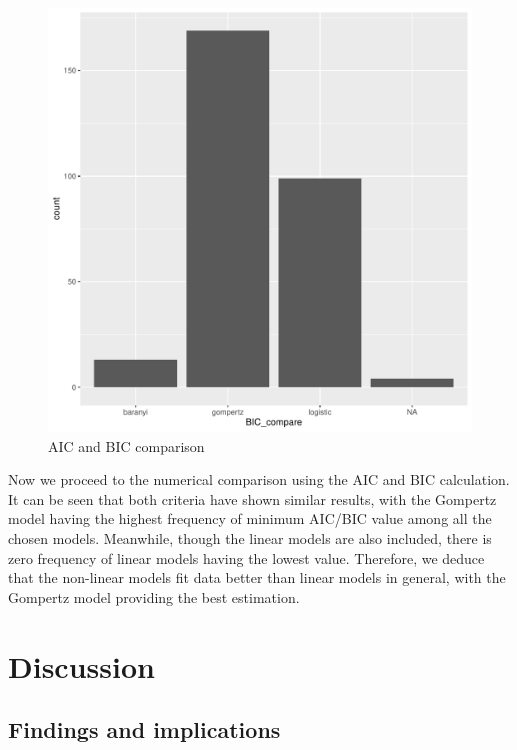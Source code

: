 \documentclass[11pt, oneside]{article}
\begin{document}
\begin{figure}[H]
\begin{center}
\begin{minipage}{.5\textwidth}
				\includegraphics[scale = 0.4]{BIC_plot.pdf}
			\end{minipage}
			\end{center}
		\caption{AIC and BIC comparison}
		\end{figure}
		
		\noindent Now we proceed to the numerical comparison using the AIC and BIC calculation. It can be seen that both criteria have shown similar results, with the Gompertz model having the highest frequency of minimum AIC/BIC value among all the chosen models. Meanwhile, though the linear models are also included,  there is zero frequency of linear models having the lowest value. Therefore, we deduce that the non-linear models fit data better than linear models in general, with the Gompertz model providing the best estimation.

	\pagebreak
	\section{Discussion}
	
	\subsection{Findings and implications}
	
\end{document}
